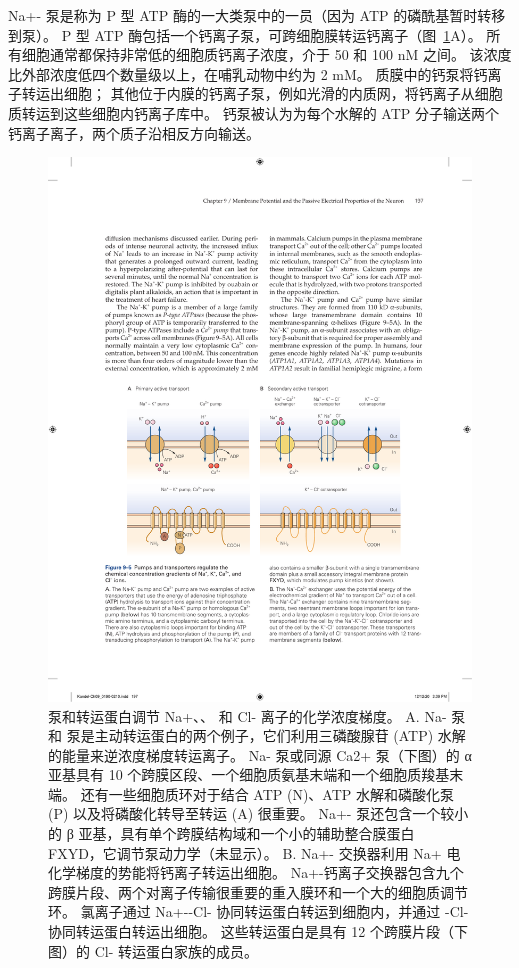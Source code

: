 Na+- 泵是称为 P 型 ATP 酶的一大类泵中的一员（因为 ATP 的磷酰基暂时转移到泵）。
P 型 ATP 酶包括一个钙离子泵，可跨细胞膜转运钙离子（图~\ref{fig:9_5}A）。
所有细胞通常都保持非常低的细胞质钙离子浓度，介于 50 和 100 nM 之间。
该浓度比外部浓度低四个数量级以上，在哺乳动物中约为 2 mM。
质膜中的钙泵将钙离子转运出细胞；
其他位于内膜的钙离子泵，例如光滑的内质网，将钙离子从细胞质转运到这些细胞内钙离子库中。
钙泵被认为为每个水解的 ATP 分子输送两个钙离子离子，两个质子沿相反方向输送。


\begin{figure}[htbp]
	\centering
	\includegraphics[width=0.7\linewidth]{chap09/fig_9_5}
	\caption{泵和转运蛋白调节 Na+、、 和 Cl- 离子的化学浓度梯度。 A. Na- 泵和  泵是主动转运蛋白的两个例子，它们利用三磷酸腺苷 (ATP) 水解的能量来逆浓度梯度转运离子。 Na- 泵或同源 Ca2+ 泵（下图）的 α 亚基具有 10 个跨膜区段、一个细胞质氨基末端和一个细胞质羧基末端。 还有一些细胞质环对于结合 ATP (N)、ATP 水解和磷酸化泵 (P) 以及将磷酸化转导至转运 (A) 很重要。 Na+- 泵还包含一个较小的 β 亚基，具有单个跨膜结构域和一个小的辅助整合膜蛋白 FXYD，它调节泵动力学（未显示）。 B. Na+- 交换器利用 Na+ 电化学梯度的势能将钙离子转运出细胞。 Na+-钙离子交换器包含九个跨膜片段、两个对离子传输很重要的重入膜环和一个大的细胞质调节环。 氯离子通过 Na+--Cl- 协同转运蛋白转运到细胞内，并通过 -Cl- 协同转运蛋白转运出细胞。 这些转运蛋白是具有 12 个跨膜片段（下图）的 Cl- 转运蛋白家族的成员。}
	\label{fig:9_5}
\end{figure}


